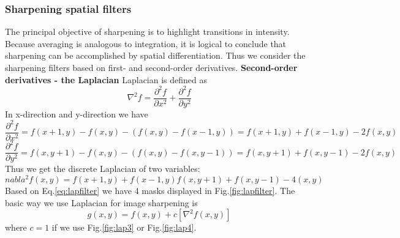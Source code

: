 \subsubsection*{Sharpening spatial filters}
The principal objective of sharpening is to highlight transitions in intensity. Because averaging is analogous to integration, it is logical to conclude that sharpening can be accomplished by spatial differentiation. Thus we consider the sharpening filters based on first- and second-order derivatives. \newline
\textbf{Second-order derivatives - the Laplacian} \newline
Laplacian is defined as \begin{equation} \nabla^2 f=\frac{\partial^2f}{\partial x^2}+\frac{\partial^2f}{\partial y^2} \end{equation} In x-direction and y-direction we have \begin{equation} \frac{\partial^2f}{\partial x^2} = f(x+1,y)-f(x,y)-(f(x,y)-f(x-1,y))=f(x+1,y)+f(x-1,y)-2f(x,y) \end{equation} \begin{equation} \frac{\partial^2f}{\partial y^2} = f(x,y+1)-f(x,y)-(f(x,y)-f(x,y-1))=f(x,y+1)+f(x,y-1)-2f(x,y) \end{equation}
Thus we get the discrete Laplacian of two variables:
\begin{equation}
nabla^2 f(x,y)=f(x+1,y)+f(x-1,y)f(x,y+1)+f(x,y-1)-4(x,y)
\label{eq:lapfilter}\end{equation} Based on Eq.\ref{eq:lapfilter} we have 4 masks displayed in Fig.\ref{fig:lapfilter}. The basic way we use Laplacian for image sharpening is \begin{equation} g(x,y)=f(x,y)+c\left[ \nabla^2 f(x,y) \right] \end{equation} where $c=1$ if we use Fig.\ref{fig:lap3} or Fig.\ref{fig:lap4}. 

